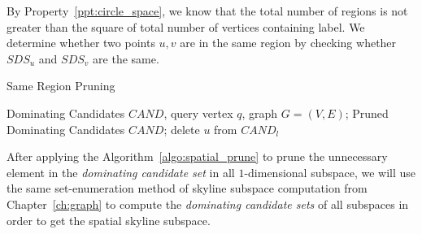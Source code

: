 By Property~\ref{ppt:circle_space}, we know that the total number of regions is not greater than the square of total number of vertices containing label. We determine whether two points $u, v$ are in the same region by checking whether $SDS_u$ and $SDS_v$ are the same.

\begin{algorithm}[H]
  \caption{Same Region Pruning}
  \label{algo:spatial_prune}
  \begin{algorithmic}[1]
  \show\LOOP
    \REQUIRE Dominating Candidates $CAND$, query vertex $q$, graph $G=(V, E)$;
    \ENSURE Pruned Dominating Candidates $CAND$;
                \STATE delete $u$ from $CAND_l$
            \ENDIF
        \ENDFOR
    \ENDFOR
  \end{algorithmic}
\end{algorithm}

After applying the Algorithm~\ref{algo:spatial_prune} to prune the unnecessary element in the \emph{dominating candidate set} in all $1$-dimensional subspace, we will use the same set-enumeration method of skyline subspace computation from Chapter~\ref{ch:graph} to compute the \emph{dominating candidate sets} of all subspaces in order to get the spatial skyline subspace.










